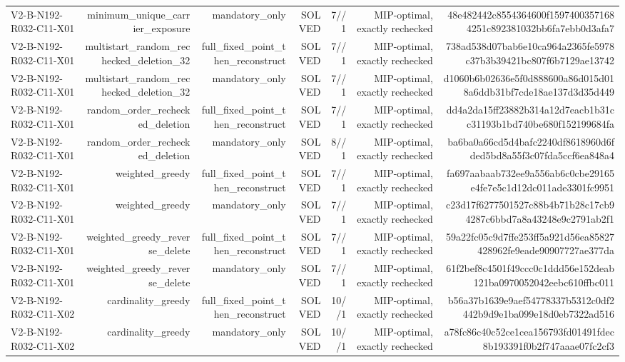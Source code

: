 {\begin{longtable}{lrrrrrr}
V2-B-N192-R032-C11-X01 & minimum\_unique\_carrier\_exposure & mandatory\_only & SOLVED & 7//1 & MIP-optimal, exactly rechecked & 48e482442c8554364600f15974003571684251c892381032bb6fa7ebb0d3afa7 \\
V2-B-N192-R032-C11-X01 & multistart\_random\_rechecked\_deletion\_32 & full\_fixed\_point\_then\_reconstruct & SOLVED & 7//1 & MIP-optimal, exactly rechecked & 738ad538d07bab6e10ca964a2365fe5978c37b3b39421bc807f6b7129ae13742 \\
V2-B-N192-R032-C11-X01 & multistart\_random\_rechecked\_deletion\_32 & mandatory\_only & SOLVED & 7//1 & MIP-optimal, exactly rechecked & d1060b6b02636e5f0d888600a86d015d018a6ddb31bf7cde18ae137d3d35d449 \\
V2-B-N192-R032-C11-X01 & random\_order\_rechecked\_deletion & full\_fixed\_point\_then\_reconstruct & SOLVED & 7//1 & MIP-optimal, exactly rechecked & dd4a2da15ff23882b314a12d7eacb1b31cc31193b1bd740be680f152199684fa \\
V2-B-N192-R032-C11-X01 & random\_order\_rechecked\_deletion & mandatory\_only & SOLVED & 8//1 & MIP-optimal, exactly rechecked & ba6ba0a66cd5d4bafc2240df8618960d6fded5bd8a55f3c07fda5ccf6ea848a4 \\
V2-B-N192-R032-C11-X01 & weighted\_greedy & full\_fixed\_point\_then\_reconstruct & SOLVED & 7//1 & MIP-optimal, exactly rechecked & fa697aabaab732ee9a556ab6c0cbe29165e4fe7e5c1d12dc011ade3301fc9951 \\
V2-B-N192-R032-C11-X01 & weighted\_greedy & mandatory\_only & SOLVED & 7//1 & MIP-optimal, exactly rechecked & c23d17f6277501527c88b4b71b28c17cb94287c6bbd7a8a43248e9c2791ab2f1 \\
V2-B-N192-R032-C11-X01 & weighted\_greedy\_reverse\_delete & full\_fixed\_point\_then\_reconstruct & SOLVED & 7//1 & MIP-optimal, exactly rechecked & 59a22fc05c9d7ffe253ff5a921d56ea85827428962fe9eade90907727ae377da \\
V2-B-N192-R032-C11-X01 & weighted\_greedy\_reverse\_delete & mandatory\_only & SOLVED & 7//1 & MIP-optimal, exactly rechecked & 61f2bef8c4501f49ccc0c1ddd56e152deab121ba0970052042eebc610ffbc011 \\
V2-B-N192-R032-C11-X02 & cardinality\_greedy & full\_fixed\_point\_then\_reconstruct & SOLVED & 10//1 & MIP-optimal, exactly rechecked & b56a37b1639e9aef54778337b5312c0df2442b9d9e1ba099e18d0eb7322ad516 \\
V2-B-N192-R032-C11-X02 & cardinality\_greedy & mandatory\_only & SOLVED & 10//1 & MIP-optimal, exactly rechecked & a78fc86c40c52ce1cea156793fd01491fdec8b193391f0b2f747aaae07fc2cf3 \\

\end{longtable}}
